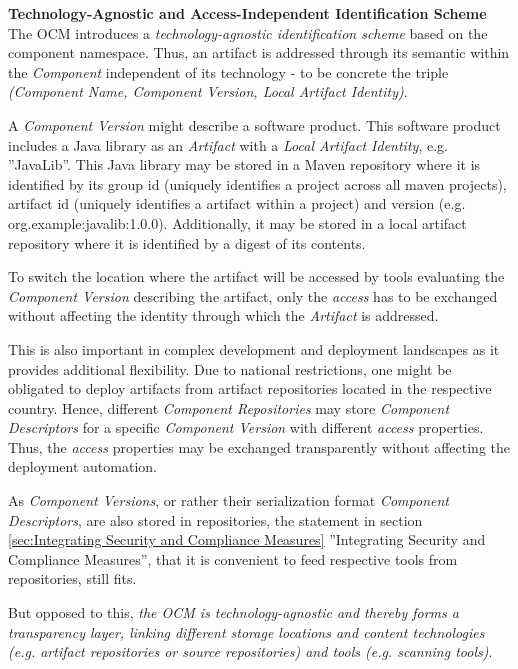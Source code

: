 \noindent\textbf{Technology-Agnostic and Access-Independent Identification Scheme}\\
The OCM introduces a \emph{technology-agnostic identification scheme} based on the component namespace. Thus, an artifact is addressed through its semantic within the \emph{Component} independent of its technology - to be concrete the triple \emph{({Component Name}, {Component Version}, {Local Artifact Identity})}.\par
A \emph{Component Version} might describe a software product. This software product includes a Java library as an \emph{Artifact} with a \emph{Local Artifact Identity}, e.g. ''JavaLib''. This Java library may be stored in a Maven repository where it is identified by its group id (uniquely identifies a project across all maven projects), artifact id (uniquely identifies a artifact within a project) and version (e.g. org.example:javalib:1.0.0). Additionally, it may be stored in a local artifact repository where it is identified by a digest of its contents.\par
To switch the location where the artifact will be accessed by tools evaluating the \emph{Component Version} describing the artifact, only the \emph{access} has to be exchanged without affecting the identity through which the \emph{Artifact} is addressed.\par 
This is also important in complex development and deployment landscapes as it provides additional flexibility. Due to national restrictions, one might be obligated to deploy artifacts from artifact repositories located in the respective country. Hence, different \emph{Component Repositories} may store \emph{Component Descriptors} for a specific \emph{Component Version} with different \emph{access} properties. Thus, the \emph{access} properties may be exchanged transparently without affecting the deployment automation.\par
As \emph{Component Versions}, or rather their serialization format \emph{Component Descriptors}, are also stored in repositories, the statement in section \ref{sec:Integrating Security and Compliance Measures} ''Integrating Security and Compliance Measures'', that it is convenient to feed respective tools from repositories, still fits.\par
But opposed to this, \emph{the OCM is technology-agnostic and thereby forms a transparency layer, linking different storage locations and content technologies (e.g. artifact repositories or source repositories) and tools (e.g. scanning tools)}.\\

